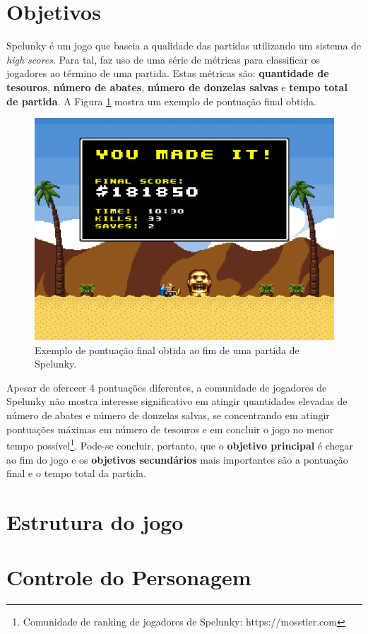 \section{\label{section:spelunky-goals}Objetivos}
Spelunky é um jogo que baseia a qualidade das partidas utilizando um sistema de
\textit{high scores}. Para tal, faz uso de uma série de métricas para
classificar os jogadores ao término de uma partida. Estas métricas são:
\textbf{quantidade de tesouros}, \textbf{número de abates}, \textbf{número de
donzelas salvas} e \textbf{tempo total de partida}. A Figura
\ref{fig:spelunky-scores} mostra um exemplo de pontuação final obtida.

\begin{figure}[htb!]
\centering
\includegraphics[width=.65\textwidth]{fig/spelunky-score.png}
\caption{\label{fig:spelunky-scores}Exemplo de pontuação final obtida ao fim de
uma partida de Spelunky.}
\end{figure}

Apesar de oferecer 4 pontuações diferentes, a comunidade de jogadores de
Spelunky não mostra interesse significativo em atingir quantidades elevadas de
número de abates e número de donzelas salvas, se concentrando em atingir
pontuações máximas em número de tesouros e em concluir o jogo no menor tempo
possível\footnote{Comunidade de ranking de jogadores de Spelunky:
https://mosstier.com}. Pode-se concluir, portanto, que o \textbf{objetivo
principal} é chegar ao fim do jogo e os \textbf{objetivos secundários} mais
importantes são a pontuação final e o tempo total da partida.

\section{\label{section:spelunky-structure}Estrutura do jogo}

\section{\label{section:spelunky-controls}Controle do Personagem}

